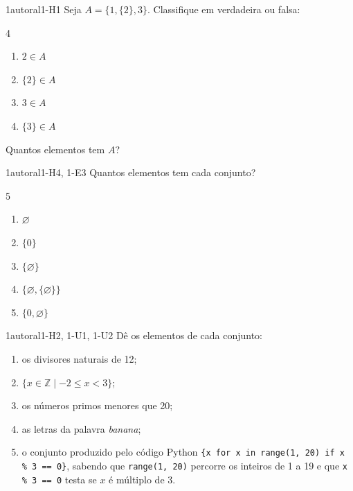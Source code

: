 \Questoes

\begin{questao}{1}{autoral}{1-H1}\label{u1:pertence}
Seja $A=\{1,\{2\},3\}$. Classifique em verdadeira ou falsa:
\begin{multicols}{4}
\begin{enumerate}[label=\alph*)]
  \item $2\in A$
  \item $\{2\}\in A$
  \item $3\in A$
  \item $\{3\}\in A$
\end{enumerate}
\end{multicols}
\noindent Quantos elementos tem $A$?
\end{questao}

\begin{questao}{1}{autoral}{1-H4, 1-E3}\label{u1:quantos}
Quantos elementos tem cada conjunto?
\begin{multicols}{5}
\begin{enumerate}[label=\alph*)]
  \item $\varnothing$
  \item $\{0\}$
  \item $\{\varnothing\}$
  \item $\{\varnothing,\{\varnothing\}\}$
  \item $\{0,\varnothing\}$
\end{enumerate}
\end{multicols}
\end{questao}

\begin{questao}{1}{autoral}{1-H2, 1-U1, 1-U2}\label{u1:listar}
Dê os elementos de cada conjunto:
\begin{enumerate}[label=\alph*)]
  \item os divisores naturais de 12;
  \item $\{x\in\mathbb{Z}\mid -2\le x<3\}$;
  \item os números primos menores que 20;
  \item as letras da palavra \emph{banana};
  \item o conjunto produzido pelo código Python \texttt{\{x for x in range(1, 20) if x \% 3 == 0\}}, sabendo que \texttt{range(1, 20)} percorre os inteiros de 1 a 19 e que \texttt{x \% 3 == 0} testa se $x$ é múltiplo de 3.
\end{enumerate}
\end{questao}

